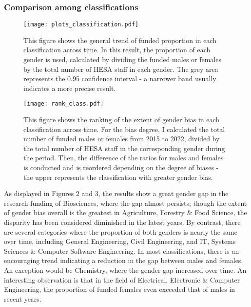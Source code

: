 \subsubsection{Comparison among classifications}
\begin{figure}
    \centering
    \texttt{[image: plots\_classification.pdf]}
    \caption{This figure shows the general trend of funded proportion in each classification across time. In this result, the proportion of each gender is used, calculated by dividing the funded males or females by the total number of HESA staff in each gender. The grey area represents the 0.95 confidence interval - a narrower band usually indicates a more precise result.}
\end{figure}
\begin{figure}
	\centering
	\texttt{[image: rank\_class.pdf]}
	\caption{This figure shows the ranking of the extent of gender bias in each classification across time. For the bias degree, I calculated the total number of funded males or females from 2015 to 2022, divided by the total number of HESA staff in the corresponding gender during the period. Then, the difference of the ratios for males and females is conducted and is reordered depending on the degree of biases - the upper represents the classification with greater gender bias.}
\end{figure}

\noindent As displayed in Figures 2 and 3, the results show a great gender gap in the research funding of Biosciences, where the gap almost persists; though the extent of gender bias overall is the greatest in Agriculture, Forestry \& Food Science, the disparity has been considered diminished in the latest years. By contrast, there are several categories where the proportion of both genders is nearly the same over time, including General Engineering, Civil Engineering, and IT, Systems Sciences \& Computer Software Engineering. In most classifications, there is an encouraging trend indicating a reduction in the gap between males and females. An exception would be Chemistry, where the gender gap increased over time. An interesting observation is that in the field of Electrical, Electronic \& Computer Engineering, the proportion of funded females even exceeded that of males in recent years. 

